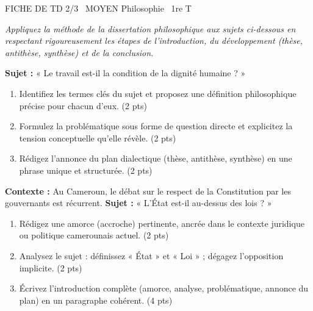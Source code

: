 \documentclass[11pt]{article}
\begin{document}
\begin{tcolorbox}[enhanced,colback=popink,colframe=popink,arc=10pt,boxrule=0pt,left=12pt,right=12pt,top=9pt,bottom=9pt]
{\color{white}\popxbold\small FICHE DE TD 2/3 \textbullet\ MOYEN \hfill Philosophie \textbullet\ 1re T\par}
\end{tcolorbox}
\vspace{4pt}
\emph{Appliquez la méthode de la dissertation philosophique aux sujets ci-dessous en respectant rigoureusement les étapes de l'introduction, du développement (thèse, antithèse, synthèse) et de la conclusion.}

\begin{exercice}
\textbf{Sujet :} « Le travail est-il la condition de la dignité humaine ? »
\begin{enumerate}
    \item Identifiez les termes clés du sujet et proposez une définition philosophique précise pour chacun d'eux. (2 pts)
    \item Formulez la problématique sous forme de question directe et explicitez la tension conceptuelle qu'elle révèle. (2 pts)
    \item Rédigez l'annonce du plan dialectique (thèse, antithèse, synthèse) en une phrase unique et structurée. (2 pts)
\end{enumerate}
\end{exercice}

\begin{exercice}
\textbf{Contexte :} Au Cameroun, le débat sur le respect de la Constitution par les gouvernants est récurrent.
\textbf{Sujet :} « L'État est-il au-dessus des lois ? »
\begin{enumerate}
    \item Rédigez une amorce (accroche) pertinente, ancrée dans le contexte juridique ou politique camerounais actuel. (2 pts)
    \item Analysez le sujet : définissez « État » et « Loi » ; dégagez l'opposition implicite. (2 pts)
    \item Écrivez l'introduction complète (amorce, analyse, problématique, annonce du plan) en un paragraphe cohérent. (4 pts)
\end{enumerate}
\end{exercice}
\end{document}
